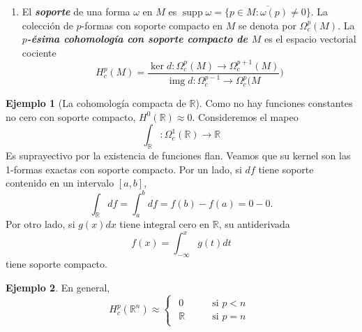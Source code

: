 \documentclass[spanish]{article}
\theoremstyle{definition}
\newtheorem*{ejem}{Ejemplo}
\newcommand{\R}{\mathbb{R}}
\DeclareMathOperator{\img}{img}
\DeclareMathOperator{\supp}{supp}
\begin{document}
\begin{enumerate}
\begin{enumerate}
			\item (Mayer-Vietoris) Supongamos que $\{U,V\}$ es una cubierta abierta de $M$. Las inclusiones
			\[\begin{tikzcd}[column sep=small,row sep=small]
				&U\arrow[dr,"k"]\\
				U\cap V\arrow[ru,"i"]\arrow[dr,swap,"j"]&&M\\
				&V\arrow[ru,swap,"l"]
			\end{tikzcd}\]
			inducen la siguiente sucesión exacta larga en cohomología:
			\[\begin{tikzcd}[column sep=small]
				\cdots\arrow[r,"\delta"]&H_{dR}^p\arrow[r,"k^*\oplus l^*"]&H_{dR}^p(U)\oplus H_{dR}^p(V)\arrow[r,"i^*-j^*"]&H_{dR}^p(U\cap V)\arrow[r,"\delta"]&H_{dR}^{p+1}(M)\arrow[r,"k^*\oplus l^*"]&\cdots
			\end{tikzcd}\]
		\end{enumerate}
		
		\item El \textbf{\textit{soporte}} de una forma $\omega$ en $M$ es $\supp \omega=\overline{\{p\in M:\omega(p)\neq0\}}$. La colección de $p$-formas con soporte compacto en $M$ se denota por $\Omega_c^p(M)$. La \textbf{\textit{$p$-ésima cohomología con soporte compacto de $M$}} es el espacio vectorial cociente
		\[H^p_c(M)=\frac{\ker d:\Omega_c^p(M)\to \Omega_c^{p+1}(M)}{\img d:\Omega_c^{p-1}\to\Omega_c^p(M})\]
	\end{enumerate}
	\begin{ejem}[La cohomología compacta de $\R$]
		Como no hay funciones constantes no cero con soporte compacto, $H^0(\R)\approx 0$. Consideremos el mapeo
		\[\int_\R:\Omega_c^1(\R)\to\R\]
		Es suprayectivo por la existencia de funciones flan. Veamos que su kernel son las 1-formas exactas con soporte compacto. Por un lado, si $df$ tiene soporte contenido en un intervalo $[a,b]$,
		\[\int_\R df=\int_a^bdf=f(b)-f(a)=0-0.\]
		Por otro lado, si $g(x)dx$ tiene integral cero en $\R$, su antiderivada
		\[f(x)=\int_{-\infty}^xg(t)dt\]
		tiene soporte compacto.			
	\end{ejem}
	\begin{ejem}
		En general,
		\[H^p_c(\R^n)\approx\begin{cases}
			\begin{aligned}
				0\qquad&\text{si }p< n\\
				\R\qquad&\text{si }p=n
			\end{aligned}
		\end{cases}\]
	\end{ejem}
	
\end{document}
